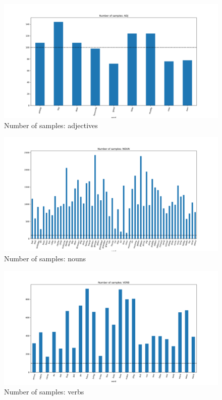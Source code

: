 \begin{figure}
  \centering
  \includegraphics[width=\textwidth]{results/targeted_triplets/num_samples_ADJ_word.png}
  \caption{Number of samples: adjectives}
  \label{fig:num_samples_ADJ_word}
\end{figure}

\begin{figure}
  \centering
  \includegraphics[width=\textwidth]{results/targeted_triplets/num_samples_NOUN_word.png}
  \caption{Number of samples: nouns}
  \label{fig:num_samples_NOUN_word}
\end{figure}

\begin{figure}
  \centering
  \includegraphics[width=\textwidth]{results/targeted_triplets/num_samples_VERB_word.png}
  \caption{Number of samples: verbs}
  \label{fig:num_samples_VERB_word}
\end{figure}

